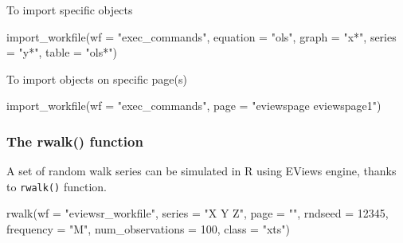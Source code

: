 \documentclass[
  letterpaper,
  DIV=11,
  numbers=noendperiod]{scrartcl}
\newenvironment{Shaded}{\begin{snugshade}}{\end{snugshade}}
\newcommand{\AttributeTok}[1]{\textcolor[rgb]{0.40,0.45,0.13}{#1}}
\newcommand{\DecValTok}[1]{\textcolor[rgb]{0.68,0.00,0.00}{#1}}
\newcommand{\FunctionTok}[1]{\textcolor[rgb]{0.28,0.35,0.67}{#1}}
\newcommand{\NormalTok}[1]{\textcolor[rgb]{0.00,0.23,0.31}{#1}}
\newcommand{\StringTok}[1]{\textcolor[rgb]{0.13,0.47,0.30}{#1}}
\begin{document}
To import specific objects

\begin{Shaded}
\begin{Highlighting}[]
\FunctionTok{import\_workfile}\NormalTok{(}\AttributeTok{wf =} \StringTok{"exec\_commands"}\NormalTok{, }\AttributeTok{equation =} \StringTok{"ols"}\NormalTok{, }\AttributeTok{graph =} \StringTok{"x*"}\NormalTok{,}
    \AttributeTok{series =} \StringTok{"y*"}\NormalTok{, }\AttributeTok{table =} \StringTok{"ols*"}\NormalTok{)}
\end{Highlighting}
\end{Shaded}

\begin{figure}

\end{figure}

To import objects on specific page(s)

\begin{Shaded}
\begin{Highlighting}[]
\FunctionTok{import\_workfile}\NormalTok{(}\AttributeTok{wf =} \StringTok{"exec\_commands"}\NormalTok{, }\AttributeTok{page =} \StringTok{"eviewspage eviewspage1"}\NormalTok{)}
\end{Highlighting}
\end{Shaded}

\begin{figure}

\end{figure}

\hypertarget{the-rwalk-function}{%
\subsubsection{The rwalk() function}\label{the-rwalk-function}}

A set of random walk series can be simulated in R using EViews engine,
thanks to \texttt{rwalk()} function.

\begin{Shaded}
\begin{Highlighting}[]
\FunctionTok{rwalk}\NormalTok{(}\AttributeTok{wf =} \StringTok{"eviewsr\_workfile"}\NormalTok{, }\AttributeTok{series =} \StringTok{"X Y Z"}\NormalTok{, }\AttributeTok{page =} \StringTok{""}\NormalTok{, }\AttributeTok{rndseed =} \DecValTok{12345}\NormalTok{,}
    \AttributeTok{frequency =} \StringTok{"M"}\NormalTok{, }\AttributeTok{num\_observations =} \DecValTok{100}\NormalTok{, }\AttributeTok{class =} \StringTok{"xts"}\NormalTok{)}
\end{Highlighting}
\end{Shaded}
\end{document}
